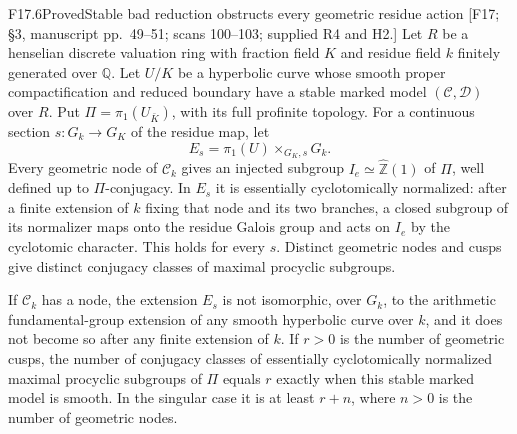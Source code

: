 \begin{result}{F17.6}{Proved}{Stable bad reduction obstructs every geometric residue action}
\textup{[F17; \S3, manuscript pp.\ 49--51; scans 100--103;
supplied R4 and H2.]}
Let $R$ be a henselian discrete valuation ring with fraction field
$K$ and residue field $k$ finitely generated over $\mathbb Q$.
Let $U/K$ be a hyperbolic curve whose smooth proper compactification
and reduced boundary have a stable marked model $(\mathcal C,\mathcal D)$
over $R$. Put $\Pi=\pi_1(U_{\bar K})$, with its full profinite topology.
For a continuous section $s:G_k\to G_K$ of the residue map, let
\[
 E_s=\pi_1(U)\mathbin{\times}_{G_K,s}G_k.
\]
Every geometric node of $\mathcal C_k$ gives an injected subgroup
$I_e\simeq\widehat{\mathbb Z}(1)$ of $\Pi$, well defined up to
$\Pi$-conjugacy. In $E_s$ it is essentially cyclotomically normalized:
after a finite extension of $k$ fixing that node and its two branches,
a closed subgroup of its normalizer maps onto the residue Galois
group and acts on $I_e$ by the cyclotomic character. This holds for
every $s$. Distinct geometric nodes and cusps give distinct conjugacy
classes of maximal procyclic subgroups.

If $\mathcal C_k$ has a node, the extension $E_s$ is not isomorphic,
over $G_k$, to the arithmetic fundamental-group extension of any
smooth hyperbolic curve over $k$, and it does not become so after
any finite extension of $k$. If $r>0$ is the number of geometric
cusps, the number of conjugacy classes of essentially cyclotomically
normalized maximal procyclic subgroups of $\Pi$ equals $r$ exactly
when this stable marked model is smooth. In the singular case it is
at least $r+n$, where $n>0$ is the number of geometric nodes.
\end{result}

